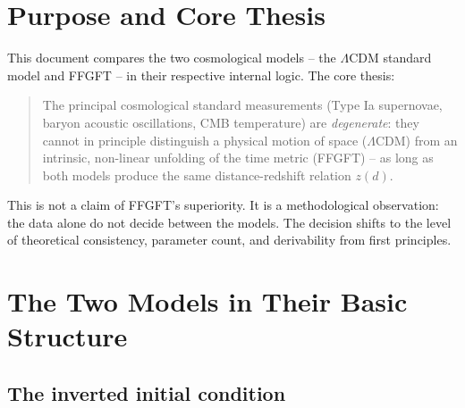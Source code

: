 %
%

\section*{Purpose and Core Thesis}

This document compares the two cosmological models -- the $\Lambda$CDM
standard model and FFGFT -- in their respective internal logic. The core
thesis:

\begin{quote}
The principal cosmological standard measurements (Type Ia supernovae,
baryon acoustic oscillations, CMB temperature) are \emph{degenerate}:
they cannot in principle distinguish a physical motion of space
($\Lambda$CDM) from an intrinsic, non-linear unfolding of the time metric
(FFGFT) -- as long as both models produce the same distance-redshift
relation $z(d)$.
\end{quote}

This is not a claim of FFGFT's superiority. It is a methodological
observation: the data alone do not decide between the models. The decision
shifts to the level of theoretical consistency, parameter count, and
derivability from first principles.

\section{The Two Models in Their Basic Structure}

\subsection*{The inverted initial condition}

